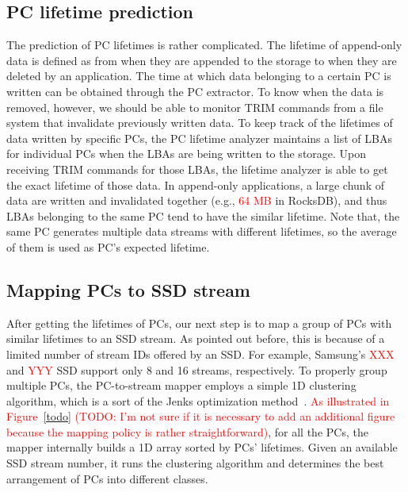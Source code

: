 \vspace{-5pt}
\subsection{PC lifetime prediction}

The prediction of PC lifetimes is rather complicated. The lifetime of
append-only data is defined as from when they are appended to the storage to
when they are deleted by an application. The time at which data belonging to a
certain PC is written can be obtained through the PC extractor. To know when
the data is removed, however, we should be able to monitor TRIM commands from a
file system that invalidate previously written data.  To keep track of the
lifetimes of data written by specific PCs, the PC lifetime analyzer maintains a
list of LBAs for individual PCs when the LBAs are being written to the storage.
Upon receiving TRIM commands for those LBAs, the lifetime analyzer is able to
get the exact lifetime of those data. In append-only applications, a large
chunk of data are written and invalidated together (e.g., \textcolor{red}{64
MB} in RocksDB), and thus LBAs belonging to the same PC tend to have the
similar lifetime. Note that, the same PC generates multiple data streams with
different lifetimes, so the average of them is used as PC's expected lifetime.


\vspace{-5pt}
\subsection{Mapping PCs to SSD stream}
After getting the lifetimes of PCs, our next step is to map a group of PCs with
similar lifetimes to an SSD stream. As pointed out before, this is because of a
limited number of stream IDs offered by an SSD. For example, Samsung's
\textcolor{red}{XXX} and \textcolor{red}{YYY} SSD support only 8 and 16
streams, respectively. To properly group multiple PCs, the PC-to-stream mapper
employs a simple 1D clustering algorithm, which is a sort of the Jenks
optimization method~\cite{}.  \textcolor{red}{As illustrated in
Figure~\ref{todo} (TODO: I'm not sure if it is necessary to add an additional
figure because the mapping policy is rather straightforward)}, for all the PCs,
the mapper internally builds a 1D array sorted by PCs' lifetimes.  Given an
available SSD stream number, it runs the clustering algorithm and determines
the best arrangement of PCs into different classes.

